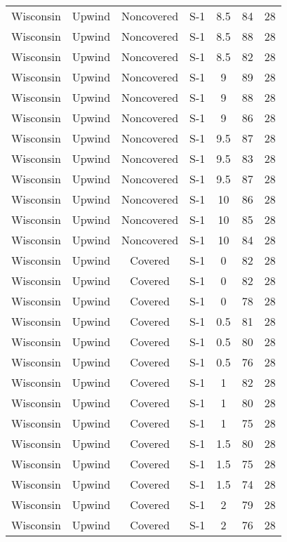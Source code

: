 \documentclass{article}
\begin{document}
\begin{longtable}[H]{ccccccc}
Wisconsin & Upwind   & Noncovered & S-1 & 8.5  & 84  & 28 \\
Wisconsin & Upwind   & Noncovered & S-1 & 8.5  & 88  & 28 \\
Wisconsin & Upwind   & Noncovered & S-1 & 8.5  & 82  & 28 \\
Wisconsin & Upwind   & Noncovered & S-1 & 9    & 89  & 28 \\
Wisconsin & Upwind   & Noncovered & S-1 & 9    & 88  & 28 \\
Wisconsin & Upwind   & Noncovered & S-1 & 9    & 86  & 28 \\
Wisconsin & Upwind   & Noncovered & S-1 & 9.5  & 87  & 28 \\
Wisconsin & Upwind   & Noncovered & S-1 & 9.5  & 83  & 28 \\
Wisconsin & Upwind   & Noncovered & S-1 & 9.5  & 87  & 28 \\
Wisconsin & Upwind   & Noncovered & S-1 & 10   & 86  & 28 \\
Wisconsin & Upwind   & Noncovered & S-1 & 10   & 85  & 28 \\
Wisconsin & Upwind   & Noncovered & S-1 & 10   & 84  & 28 \\
Wisconsin & Upwind   & Covered     & S-1 & 0    & 82  & 28 \\
Wisconsin & Upwind   & Covered     & S-1 & 0    & 82  & 28 \\
Wisconsin & Upwind   & Covered     & S-1 & 0    & 78  & 28 \\
Wisconsin & Upwind   & Covered     & S-1 & 0.5  & 81  & 28 \\
Wisconsin & Upwind   & Covered     & S-1 & 0.5  & 80  & 28 \\
Wisconsin & Upwind   & Covered     & S-1 & 0.5  & 76  & 28 \\
Wisconsin & Upwind   & Covered     & S-1 & 1    & 82  & 28 \\
Wisconsin & Upwind   & Covered     & S-1 & 1    & 80  & 28 \\
Wisconsin & Upwind   & Covered     & S-1 & 1    & 75  & 28 \\
Wisconsin & Upwind   & Covered     & S-1 & 1.5  & 80  & 28 \\
Wisconsin & Upwind   & Covered     & S-1 & 1.5  & 75  & 28 \\
Wisconsin & Upwind   & Covered     & S-1 & 1.5  & 74  & 28 \\
Wisconsin & Upwind   & Covered     & S-1 & 2    & 79  & 28 \\
Wisconsin & Upwind   & Covered     & S-1 & 2    & 76  & 28 \\

\end{longtable}
\end{document}
